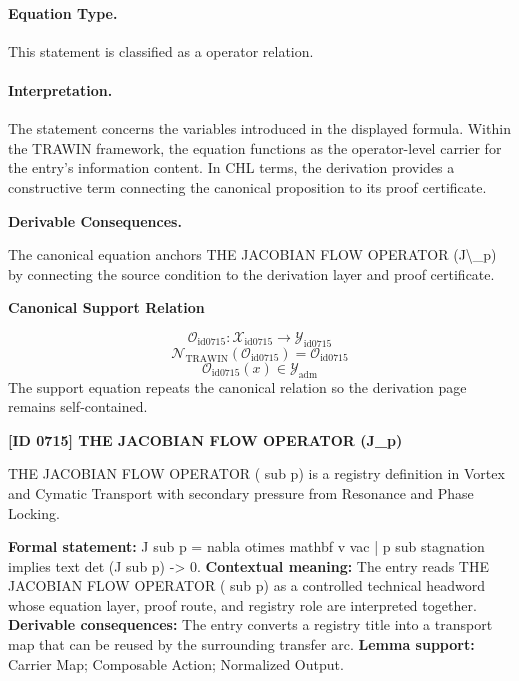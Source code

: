 \paragraph{Equation Type.}
This statement is classified as a operator relation.

\paragraph{Interpretation.}
The statement concerns the variables introduced in the displayed formula. Within the TRAWIN framework, the equation functions as the operator-level carrier for the entry’s information content. In CHL terms, the derivation provides a constructive term connecting the canonical proposition to its proof certificate.

\par\vspace{0.35em}
\noindent\textbf{Derivable Consequences.}\quad
\begingroup
\footnotesize
\raggedright
The canonical equation anchors THE JACOBIAN FLOW OPERATOR (J\textbackslash{}\_p) by connecting the source condition to the derivation layer and proof certificate.
\par\endgroup

\noindent\textbf{Canonical Support Relation}\par
\[
\mathcal{O}_{\mathrm{id0715}}:\mathcal{X}_{\mathrm{id0715}}\longrightarrow\mathcal{Y}_{\mathrm{id0715}}
\]
\[
\mathcal{N}_{\mathrm{TRAWIN}}(\mathcal{O}_{\mathrm{id0715}})=\mathcal{O}_{\mathrm{id0715}}
\]
\[
\mathcal{O}_{\mathrm{id0715}}(x)\in\mathcal{Y}_{\mathrm{adm}}
\]
\noindent The support equation repeats the canonical relation so the derivation page remains self-contained.\par

\clearpage
\noindent\textbf{[ID 0715] THE JACOBIAN FLOW OPERATOR (J\_p)}\par
\vspace{0.35em}
\begingroup\small
{}
THE JACOBIAN FLOW OPERATOR (  sub p) is a registry definition in Vortex and Cymatic Transport with secondary pressure from Resonance and Phase Locking.

\begingroup\footnotesize\setlength{\emergencystretch}{3em}\sloppy
\textbf{Formal statement:} J sub p = nabla otimes mathbf v vac | p sub stagnation implies text det (J sub p) -> 0. \textbf{Contextual meaning:} The entry reads THE JACOBIAN FLOW OPERATOR (  sub p) as a controlled technical headword whose equation layer, proof route, and registry role are interpreted together. \textbf{Derivable consequences:} The entry converts a registry title into a transport map that can be reused by the surrounding transfer arc. \textbf{Lemma support:} Carrier Map; Composable Action; Normalized Output.\par
\endgroup

